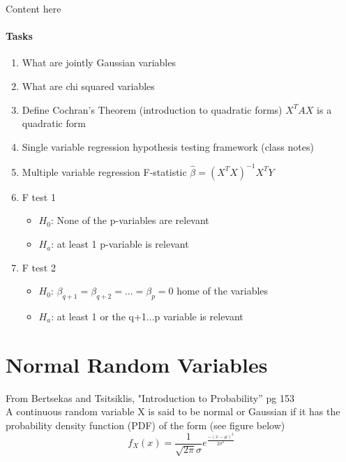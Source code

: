 





\MakeScribeTop

Content here
\paragraph{Tasks}
\begin{enumerate}

    \item What are jointly Gaussian variables 
    \item  What are chi squared variables
    \item Define Cochran's Theorem (introduction to quadratic forms) $X^T A X$ is a quadratic form
    \item Single variable regression hypothesis testing framework (class notes)
    \item Multiple variable regression F-statistic $\hat{\beta} = (X^TX)^{-1}X^TY$
    \item F test 1
    \begin{itemize}
        \item $H_0$: None of the p-variables are relevant
        \item $H_a$: at least 1 p-variable is relevant
    \end{itemize}
    \item F test 2
    \begin{itemize}
        \item $H_0$: $\beta_{q+1}=\beta_{q+2}= ...=\beta_{p} = 0$ home of the variables 
        \item $H_a$: at least 1 or the q+1...p variable is relevant
    \end{itemize}
\end{enumerate}
\section{Normal Random Variables}
From Bertsekas and Tsitsiklis, "Introduction to Probability'' pg 153 \\
A continuous random variable X is said to be normal or Gaussian if it has the probability density function (PDF) of the form (see figure below)
\[
f_X(x)= \frac{1}{\sqrt{2\pi}\sigma}e^\frac{{-(x-\mu)^2}}{2\sigma^2}
\]

